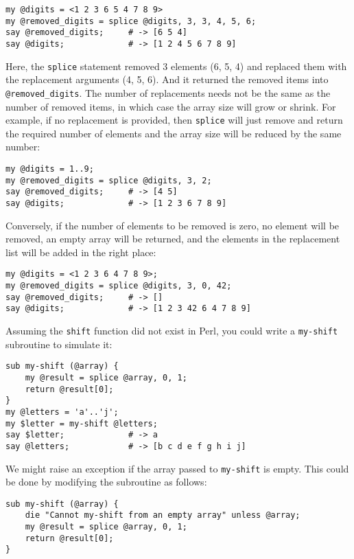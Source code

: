\begin{verbatim}
my @digits = <1 2 3 6 5 4 7 8 9>
my @removed_digits = splice @digits, 3, 3, 4, 5, 6;
say @removed_digits;     # -> [6 5 4]
say @digits;             # -> [1 2 4 5 6 7 8 9]
\end{verbatim}
%
Here, the {\tt splice} statement removed 3 elements (6, 5, 4) 
and replaced them with the replacement arguments (4, 5, 6). 
And it returned the removed items into \verb'@removed_digits'. 
The number of replacements needs not be the same as the number 
of removed items, in which case the array size will grow or 
shrink. For example, if no replacement is provided, then 
{\tt splice} will just remove and return the required number 
of elements and the array size will be reduced by the same number:

\begin{verbatim}
my @digits = 1..9;
my @removed_digits = splice @digits, 3, 2;
say @removed_digits;     # -> [4 5]
say @digits;             # -> [1 2 3 6 7 8 9]
\end{verbatim}
%

Conversely, if the number of elements to be removed is zero, 
no element will be removed, an empty array will be returned, 
and the elements in the replacement list will be added in 
the right place:

\begin{verbatim}
my @digits = <1 2 3 6 4 7 8 9>;
my @removed_digits = splice @digits, 3, 0, 42;
say @removed_digits;     # -> []
say @digits;             # -> [1 2 3 42 6 4 7 8 9]
\end{verbatim}
%

Assuming the {\tt shift} function did not exist in Perl, 
you could write a {\tt my-shift} subroutine to simulate it:

\begin{verbatim}
sub my-shift (@array) {
    my @result = splice @array, 0, 1;
    return @result[0];
}
my @letters = 'a'..'j';
my $letter = my-shift @letters;
say $letter;             # -> a
say @letters;            # -> [b c d e f g h i j]
\end{verbatim}

We might raise an exception if the array passed to 
{\tt my-shift} is empty. This could be done by modifying 
the subroutine as follows:

\begin{verbatim}
sub my-shift (@array) {
    die "Cannot my-shift from an empty array" unless @array;
    my @result = splice @array, 0, 1;
    return @result[0];
}
\end{verbatim}
%

